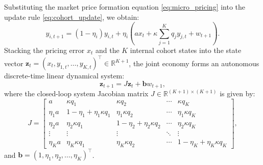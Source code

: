 \documentclass[12pt]{article}
\theoremstyle{definition}
\theoremstyle{remark}
\newcommand{\R}{\mathbb{R}}
\begin{document}
Substituting the market price formation equation \eqref{eq:micro_pricing} into the update rule \eqref{eq:cohort_update}, we obtain:
\begin{equation}
y_{i, t+1} = (1 - \eta_i) y_{i, t} + \eta_i \left( a x_t + \kappa \sum_{j=1}^K q_j y_{j, t} + w_{t+1} \right).
\end{equation}
Stacking the pricing error $x_t$ and the $K$ internal cohort states into the state vector $\mathbf{z}_t = (x_t, y_{1,t}, \dots, y_{K,t})^\top \in \R^{K+1}$, the joint economy forms an autonomous discrete-time linear dynamical system:
\begin{equation}
\mathbf{z}_{t+1} = J \mathbf{z}_t + \mathbf{b} w_{t+1},
\label{eq:state_space_system}
\end{equation}
where the closed-loop system Jacobian matrix $J \in \R^{(K+1) \times (K+1)}$ is given by:
\begin{equation}
J = \begin{bmatrix}
a & \kappa q_1 & \kappa q_2 & \cdots & \kappa q_K \\
\eta_1 a & 1 - \eta_1 + \eta_1 \kappa q_1 & \eta_1 \kappa q_2 & \cdots & \eta_1 \kappa q_K \\
\eta_2 a & \eta_2 \kappa q_1 & 1 - \eta_2 + \eta_2 \kappa q_2 & \cdots & \eta_2 \kappa q_K \\
\vdots & \vdots & \vdots & \ddots & \vdots \\
\eta_K a & \eta_K \kappa q_1 & \eta_K \kappa q_2 & \cdots & 1 - \eta_K + \eta_K \kappa q_K
\end{bmatrix},
\label{eq:full_jacobian}
\end{equation}
and $\mathbf{b} = (1, \eta_1, \eta_2, \dots, \eta_K)^\top$.
\end{document}
